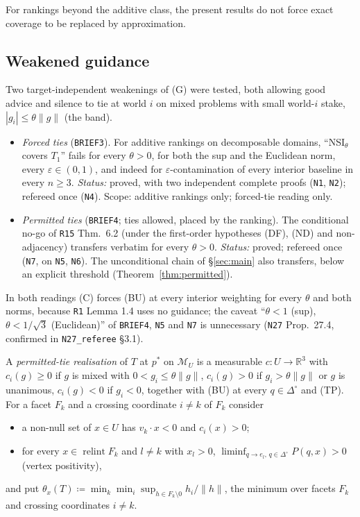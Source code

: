 \documentclass[11pt]{article}
\theoremstyle{definition}
\theoremstyle{remark}
\newcommand{\R}{\mathbb R}
\newcommand{\Di}{\Delta^{\circ}}
\newcommand{\M}{\mathcal M}
\newcommand{\relint}{\operatorname{relint}}
\newcommand{\src}[1]{\texttt{#1}}
\begin{document}
For rankings beyond the additive class, the present results do not force exact coverage to be replaced by approximation.

\subsection{Weakened guidance}\label{sec:open-ties}
Two target-independent weakenings of (G) were tested, both allowing good advice and silence to tie at world $i$ on mixed problems with small world-$i$ stake, $|g_i|\le\theta\|g\|$ (the band).
\begin{itemize}[leftmargin=*]
\item \emph{Forced ties} (\src{BRIEF3}). For additive rankings on decomposable domains, ``NSI$_\theta$ covers $T_1$'' fails for every $\theta>0$, for both the sup and the Euclidean norm, every $\varepsilon\in(0,1)$, and indeed for $\varepsilon$-contamination of every interior baseline in every $n\ge3$. \emph{Status:} proved, with two independent complete proofs (\src{N1}, \src{N2}); refereed once (\src{N4}). Scope: additive rankings only; forced-tie reading only.
\item \emph{Permitted ties} (\src{BRIEF4}; ties allowed, placed by the ranking). The conditional no-go of \src{R15} Thm.~6.2 (under the first-order hypotheses (DF), (ND) and non-adjacency) transfers verbatim for every $\theta>0$. \emph{Status:} proved; refereed once (\src{N7}, on \src{N5}, \src{N6}). The unconditional chain of \S\ref{sec:main} also transfers, below an explicit threshold (Theorem~\ref{thm:permitted}).
\end{itemize}
In both readings (C) forces (BU) at every interior weighting for every $\theta$ and both norms, because \src{R1} Lemma 1.4 uses no guidance; the caveat ``$\theta<1$ (sup), $\theta<1/\sqrt3$ (Euclidean)'' of \src{BRIEF4}, \src{N5} and \src{N7} is unnecessary (\src{N27} Prop.~27.4, confirmed in \src{N27\_referee} \S3.1).

A \emph{permitted-tie realisation} of $T$ at $p^*$ on $\M_U$ is a measurable $c:U\to\R^3$ with $c_i(g)\ge0$ if $g$ is mixed with $0<g_i\le\theta\|g\|$, $c_i(g)>0$ if $g_i>\theta\|g\|$ or $g$ is unanimous, $c_i(g)<0$ if $g_i<0$, together with (BU) at every $q\in\Di$ and (TP). For a facet $F_k$ and a crossing coordinate $i\ne k$ of $F_k$ consider
\begin{itemize}[leftmargin=*]
\item[\textbf{(X$_{ik}$)}] a non-null set of $x\in U$ has $v_k\cdot x<0$ and $c_i(x)>0$;
\item[\textbf{(VP)}] for every $x\in\relint F_k$ and $l\ne k$ with $x_l>0$, $\liminf_{q\to e_l,\,q\in\Di}P(q,x)>0$ (vertex positivity),
\end{itemize}
and put $\theta_x(T)\coloneqq\min_k\min_{i}\sup_{h\in F_k\setminus0}h_i/\|h\|$, the minimum over facets $F_k$ and crossing coordinates $i\ne k$.
\end{document}
